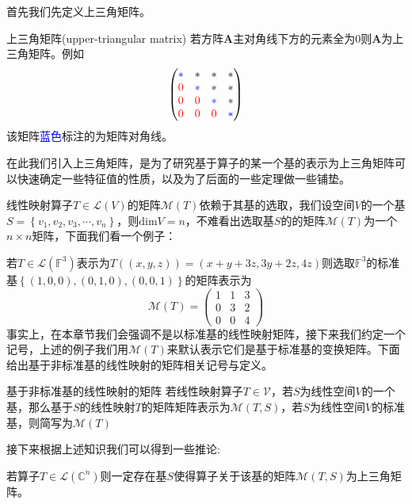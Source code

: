 首先我们先定义上三角矩阵。

\begin{definition}{上三角矩阵(upper-triangular matrix)}
	若方阵$\mathbf{A}$主对角线下方的元素全为0则$\mathbf{A}$为上三角矩阵。例如$$\begin{pmatrix}
 \textcolor{blue}{*}  & * & * & *\\
 \textcolor{red}{0}  & \textcolor{blue}{*} & * & *\\
 \textcolor{red}{0} & \textcolor{red}{0} & \textcolor{blue}{*} & *\\
 \textcolor{red}{0} & \textcolor{red}{0} & \textcolor{red}{0} & \textcolor{blue}{*}
\end{pmatrix}$$该矩阵\textcolor{blue}{蓝色}标注的为矩阵对角线。
\end{definition}

在此我们引入上三角矩阵，是为了研究基于算子的某一个基的表示为上三角矩阵可以快速确定一些特征值的性质，以及为了后面的一些定理做一些铺垫。

线性映射算子$T\in\mathcal{L}(V)$的矩阵$\mathcal{M}(T)$依赖于其基的选取，我们设空间$V$的一个基$S=\left\{ v_1,v_2,v_3,\cdots,v_n \right\}$，则$\text{dim}V=n$，不难看出选取基$S$的的矩阵$\mathcal{M}(T)$为一个$n\times n$矩阵，下面我们看一个例子：

若$T\in \mathcal{L}(\mathbb{F}^3)$表示为$T((x,y,z))=(x+y+3z,3y+2z,4z)$则选取$\mathbb{F}^3$的标准基$\left\{ (1,0,0),(0,1,0),(0,0,1) \right\}$的矩阵表示为$$\mathcal{M}(T)=\begin{pmatrix}
 1 & 1 & 3\\
 0 & 3 & 2\\
 0 & 0 & 4
\end{pmatrix}$$事实上，在本章节我们会强调不是以标准基的线性映射矩阵，接下来我们约定一个记号，上述的例子我们用$\mathcal{M}(T)$来默认表示它们是基于标准基的变换矩阵。下面给出基于非标准基的线性映射的矩阵相关记号与定义。
\begin{definition}{基于非标准基的线性映射的矩阵}
	若线性映射算子$T\in\mathcal{V}$，若$S$为线性空间$V$的一个基，那么基于$S$的线性映射$T$的矩阵矩阵表示为$\mathcal{M}(T,S)$，若$S$为线性空间$V$的标准基，则简写为$\mathcal{M}(T)$
\end{definition}

接下来根据上述知识我们可以得到一些推论:

\begin{corollary}
	\label{cor:tri}
	若算子$T\in\mathcal{L}(\mathbb{C}^n)$则一定存在基$S$使得算子关于该基的矩阵$\mathcal{M}(T,S)$为上三角矩阵。
\end{corollary}

